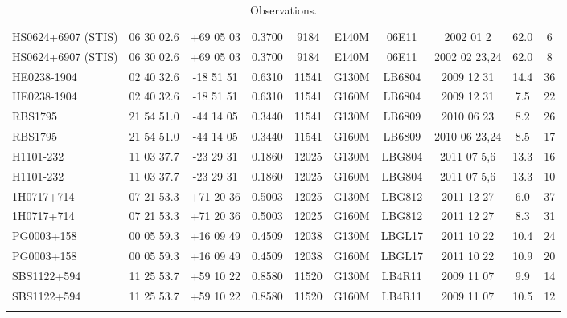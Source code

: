 \documentclass[iop]{emulateapj-rtx4}
\begin{document}
\begin{table}[ht]
\begin{center}
\begin{tabular}{l c c c c c c c c c}
 HS0624+6907 (STIS)               & 06 30 02.6  &  +69 05 03  &  0.3700 & 9184   & E140M      & 06E11      & 2002 01 2    &   62.0 &  6  \\
 HS0624+6907 (STIS)               & 06 30 02.6  &  +69 05 03  &  0.3700 & 9184	& E140M      & 06E11      & 2002 02 23,24  &   62.0 &  8  \\
 HE0238-1904 				& 02 40 32.6  &  -18 51 51   &  0.6310 & 11541 & G130M      & LB6804   & 2009 12 31  &   14.4 &  36  \\
 HE0238-1904 				& 02 40 32.6  &  -18 51 51   &  0.6310 & 11541 & G160M      & LB6804   & 2009 12 31  &   7.5 &  22  \\
 RBS1795 				& 21 54 51.0  &  -44 14 05   &  0.3440 & 11541 & G130M      & LB6809   & 2010 06 23  &     8.2 &  26  \\
 RBS1795 				& 21 54 51.0  &  -44 14 05   &  0.3440 & 11541 & G160M      & LB6809   & 2010 06 23,24  &     8.5 &  17  \\
 H1101-232 				& 11 03 37.7  &  -23 29 31   &  0.1860 & 12025 & G130M      & LBG804  & 2011 07 5,6  &   13.3 &  16  \\
 H1101-232 				& 11 03 37.7  &  -23 29 31   &  0.1860 & 12025 & G160M      & LBG804  & 2011 07 5,6  &   13.3 &  10  \\
 1H0717+714 				& 07 21 53.3  &  +71 20 36  &  0.5003 & 12025	& G130M      & LBG812  & 2011 12 27  &     6.0 &  37  \\
 1H0717+714 				& 07 21 53.3  &  +71 20 36  &  0.5003 & 12025	& G160M      & LBG812  & 2011 12 27  &     8.3 &  31  \\
 PG0003+158 				& 00 05 59.3  &  +16 09 49  &  0.4509 & 12038 & G130M      & LBGL17  & 2011 10 22  &   10.4 &  24  \\
 PG0003+158 				& 00 05 59.3  &  +16 09 49  &  0.4509 & 12038 & G160M      & LBGL17  & 2011 10 22  &   10.9 &  20  \\
 SBS1122+594 			        & 11 25 53.7  &  +59 10 22   &  0.8580 & 11520	& G130M      & LB4R11  & 2009 11 07  &     9.9 &  14  \\
 SBS1122+594 			        & 11 25 53.7  &  +59 10 22   &  0.8580 & 11520	& G160M      & LB4R11  & 2009 11 07  &   10.5 &  12  \\
 \\
\hline

\end{tabular}
\end{center}
  \caption{\small{Observations.}}
  \label{target_table}
\end{table}
\end{document}
